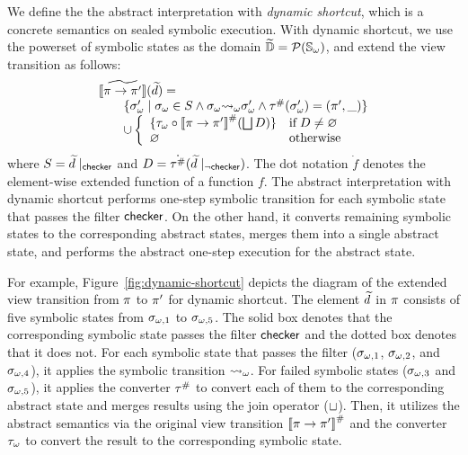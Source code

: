 We define the the abstract interpretation with \textit{dynamic shortcut}, which
is a concrete semantics on sealed symbolic execution.  With dynamic shortcut,
we use the powerset of symbolic states as the domain $\widetilde{\mathbb{D}} =
\mathcal{P}({\mathbb{S}}_\omega)$, and extend the view transition as follows:
\[
  \begin{array}{l}
    [\![{\widetilde{\pi \rightarrow \pi'}}]\!](\widetilde{d}) =\\
    \qquad \{
      {\sigma}_\omega' \mid {\sigma}_\omega \in S \wedge
      {\sigma}_\omega {\leadsto}_\omega {\sigma}_\omega' \wedge
      {\tau}^{\#}({\sigma}_\omega') = (\pi', \_)
    \}\\
    \qquad \cup \left\{
    \begin{array}{ll}
      \{ {\tau}_\omega \circ {[\![{\pi\rightarrow \pi'}]\!]}^{\#}(\bigsqcup D) \}
      & \text{if} \; D \neq \varnothing\\
      \varnothing & \text{otherwise}\\
    \end{array}
    \right.
  \end{array}
\]
where $S = \widetilde{d}\mid_{\textsf{checker}}$ and $D =
\dot{{\tau}^{\#}}(\widetilde{d}\mid_{\neg\textsf{checker}})$.  The dot notation $\dot{f}$
denotes the element-wise extended function of a function $f$.  The abstract
interpretation with dynamic shortcut performs one-step symbolic transition for
each symbolic state that passes the filter $\textsf{checker}$. On the other hand, it
converts remaining symbolic states to the corresponding abstract states, merges
them into a single abstract state, and performs the abstract one-step execution
for the abstract state.

For example, Figure~\ref{fig:dynamic-shortcut} depicts the
diagram of the extended view transition from $\pi$ to $\pi'$ for dynamic
shortcut.  The element $\widetilde{d}$ in $\pi$ consists of five symbolic states
from $\sigma_{\omega,1}$ to $\sigma_{\omega,5}$.  The solid box denotes that the corresponding
symbolic state passes the filter $\textsf{checker}$ and the dotted box denotes that it
does not.  For each symbolic state that passes the filter ($\sigma_{\omega,1}$,
$\sigma_{\omega,2}$, and $\sigma_{\omega,4}$), it applies the symbolic transition ${\leadsto}_\omega$.
For failed symbolic states ($\sigma_{\omega,3}$ and $\sigma_{\omega,5}$), it applies the
converter ${\tau}^{\#}$ to convert each of them to the corresponding abstract
state and merges results using the join operator ($\sqcup$).  Then, it utilizes
the abstract semantics via the original view transition
${[\![{\pi \rightarrow \pi'}]\!]}^{\#}$ and the converter ${\tau}_\omega$ to convert the
result to the corresponding symbolic state.

